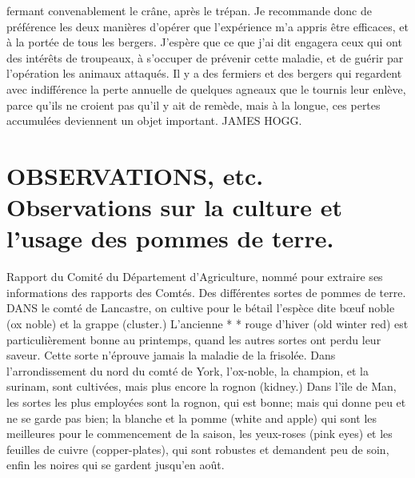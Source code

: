 \setcounter{page}{259} fermant convenablement le crâne, après le trépan. Je recommande donc de préférence les deux manières d'opérer que l'expérience m'a appris être efficaces, et à la portée de tous les bergers. J'espère que ce que j'ai dit engagera ceux qui ont des intérêts de troupeaux, à s'occuper de prévenir cette maladie, et de guérir par l'opération les animaux attaqués. Il y a des fermiers et des bergers qui regardent avec indifférence la perte annuelle de quelques agneaux que le tournis leur enlève, parce qu'ils ne croient pas qu'il y ait de remède, mais à la longue, ces pertes accumulées deviennent un objet important.
JAMES HOGG.
\section{OBSERVATIONS, etc. Observations sur la culture et l'usage des pommes de terre.}
Rapport du Comité du Département d'Agriculture, nommé pour extraire ses informations des rapports des Comtés.
Des différentes sortes de pommes de terre.
DANS le comté de Lancastre, on cultive pour le bétail l'espèce dite bœuf noble (ox noble) et la grappe (cluster.) L'ancienne
* *\setcounter{page}{260} rouge d'hiver (old winter red) est particulièrement bonne au printemps, quand les autres sortes ont perdu leur saveur. Cette sorte n'éprouve jamais la maladie de la frisolée.
Dans l'arrondissement du nord du comté de York, l'ox-noble, la champion, et la surinam, sont cultivées, mais plus encore la rognon (kidney.)
Dans l'île de Man, les sortes les plus employées sont la rognon, qui est bonne; mais qui donne peu et ne se garde pas bien; la blanche et la pomme (white and apple) qui sont les meilleures pour le commencement de la saison, les yeux-roses (pink eyes) et les feuilles de cuivre (copper-plates), qui sont robustes et demandent peu de soin, enfin les noires qui se gardent jusqu'en août.
